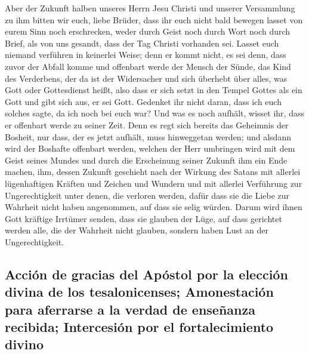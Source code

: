  Aber der Zukunft halben unseres Herrn Jesu Christi und
unserer Versammlung zu ihm bitten wir euch, liebe Brüder, 
dass ihr euch nicht bald bewegen lasset von eurem Sinn noch erschrecken,
weder durch Geist noch durch Wort noch durch Brief, als von uns gesandt,
dass der Tag Christi vorhanden sei.  Lasset euch niemand
verführen in keinerlei Weise; denn er kommt nicht, es sei denn, dass
zuvor der Abfall komme und offenbart werde der Mensch der Sünde, das
Kind des Verderbens,  der da ist der Widersacher und sich
überhebt über alles, was Gott oder Gottesdienst heißt, also dass er sich
setzt in den Tempel Gottes als ein Gott und gibt sich aus, er sei Gott.
 Gedenket ihr nicht daran, dass ich euch solches sagte, da
ich noch bei euch war?  Und was es noch aufhält, wisset
ihr, dass er offenbart werde zu seiner Zeit.  Denn es regt
sich bereits das Geheimnis der Bosheit, nur dass, der es jetzt aufhält,
muss hinweggetan werden;  und alsdann wird der Boshafte
offenbart werden, welchen der Herr umbringen wird mit dem Geist seines
Mundes und durch die Erscheinung seiner Zukunft ihm ein Ende machen,
 ihm, dessen Zukunft geschieht nach der Wirkung des Satans
mit allerlei lügenhaftigen Kräften und Zeichen und Wundern
 und mit allerlei Verführung zur Ungerechtigkeit unter
denen, die verloren werden, dafür dass sie die Liebe zur Wahrheit nicht
haben angenommen, auf dass sie selig würden.  Darum wird
ihnen Gott kräftige Irrtümer senden, dass sie glauben der Lüge,
 auf dass gerichtet werden alle, die der Wahrheit nicht
glauben, sondern haben Lust an der Ungerechtigkeit.

\hypertarget{acciuxf3n-de-gracias-del-apuxf3stol-por-la-elecciuxf3n-divina-de-los-tesalonicenses-amonestaciuxf3n-para-aferrarse-a-la-verdad-de-enseuxf1anza-recibida-intercesiuxf3n-por-el-fortalecimiento-divino}{%
\subsection{Acción de gracias del Apóstol por la elección divina de los
tesalonicenses; Amonestación para aferrarse a la verdad de enseñanza
recibida; Intercesión por el fortalecimiento
divino}\label{acciuxf3n-de-gracias-del-apuxf3stol-por-la-elecciuxf3n-divina-de-los-tesalonicenses-amonestaciuxf3n-para-aferrarse-a-la-verdad-de-enseuxf1anza-recibida-intercesiuxf3n-por-el-fortalecimiento-divino}}

